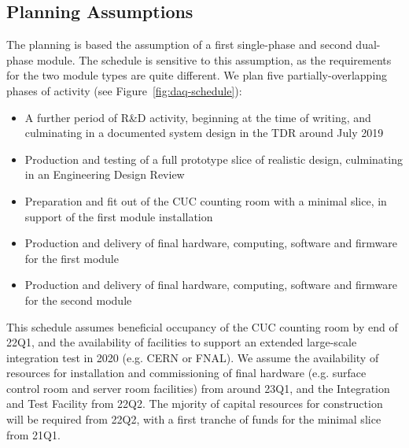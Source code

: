 \subsection{Planning Assumptions}
\label{sec:fd-daq-org-assmp}

The  planning is based the assumption of a first single-phase and second dual-phase module. The schedule is sensitive to this assumption, as the  requirements for the two module types are quite different. We plan five partially-overlapping phases of activity (see Figure~\ref{fig:daq-schedule}):

\begin{itemize}
	\item A further period of R\&D activity, beginning at the time of writing, and culminating in a documented system design in the TDR around July 2019
	\item Production and testing of a full prototype  slice of realistic design, culminating in an Engineering Design Review
	\item Preparation and fit out of the CUC counting room with a minimal  slice, in support of the first module installation
	\item Production and delivery of final hardware, computing, software and firmware for the first module
	\item Production and delivery of final hardware, computing, software and firmware for the second module
\end{itemize}

This schedule assumes beneficial occupancy of the CUC counting room by end of 22Q1, and the availability of facilities to support an extended large-scale integration test in 2020 (e.g. CERN or FNAL). We assume the availability of resources for installation and commissioning of final  hardware (e.g. surface control room and server room facilities) from around 23Q1, and the Integration and Test Facility from 22Q2. The mjority of capital resources for  construction will be required from 22Q2, with a first tranche of funds for the minimal  slice from 21Q1.



